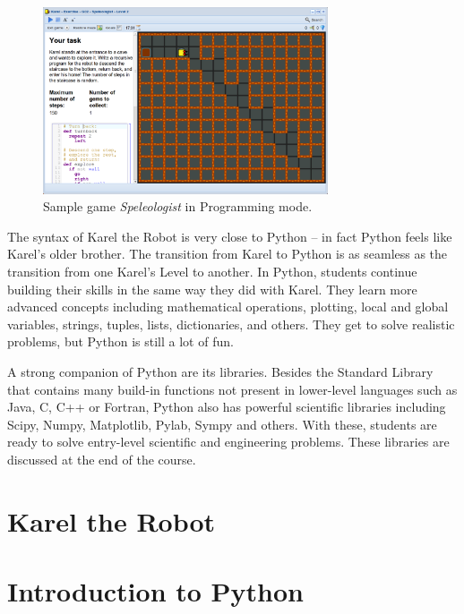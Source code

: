 \documentclass[article,A4,12pt]{llncs}
\begin{document}
\begin{figure}[!ht]
\begin{center}
\includegraphics[width=0.75\textwidth]{imgk/fore-2.png}
\end{center}
\vspace{-2mm}
\caption{Sample game {\em Speleologist} in Programming mode.}
\label{fig:f2}
\vspace{-4mm}
\end{figure}
\noindent
The syntax of Karel the Robot is very close to Python -- in fact Python feels like Karel's
older brother. The transition from Karel to Python is as seamless as the transition from 
one Karel's Level to another. 
In Python, students continue building their skills in the same way they did with Karel. 
They learn more advanced concepts including mathematical operations, plotting, local and 
global variables, strings, tuples, lists, dictionaries, and others. They get to solve 
realistic problems, but Python is still a lot of fun. 

A strong companion of Python are its libraries. Besides the Standard Library that
contains many build-in functions not present in lower-level languages such as 
Java, C, C++ or Fortran, Python also has powerful scientific libraries including 
Scipy, Numpy, Matplotlib, Pylab, Sympy and others. With these, students are ready to 
solve entry-level scientific and engineering problems. These libraries are discussed
at the end of the course.  

\part{Karel the Robot}



\part{Introduction to Python}
\end{document}
